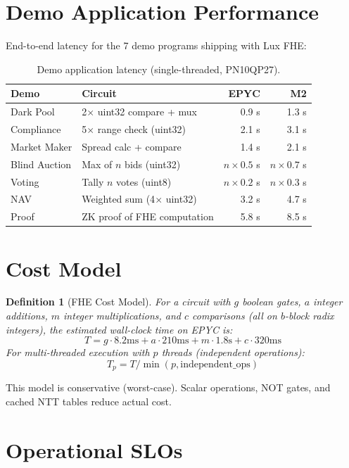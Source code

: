 \documentclass[11pt]{article}
\newtheorem{definition}{Definition}
\begin{document}
\section{Demo Application Performance}

End-to-end latency for the 7 demo programs shipping with Lux FHE:

\begin{table}[h]
\centering
\small
\begin{tabular}{@{}llrr@{}}
\toprule
\textbf{Demo} & \textbf{Circuit} & \textbf{EPYC} & \textbf{M2} \\
\midrule
Dark Pool & 2$\times$ uint32 compare + mux & 0.9 s & 1.3 s \\
Compliance & 5$\times$ range check (uint32) & 2.1 s & 3.1 s \\
Market Maker & Spread calc + compare & 1.4 s & 2.1 s \\
Blind Auction & Max of $n$ bids (uint32) & $n \times 0.5$ s & $n \times 0.7$ s \\
Voting & Tally $n$ votes (uint8) & $n \times 0.2$ s & $n \times 0.3$ s \\
NAV & Weighted sum (4$\times$ uint32) & 3.2 s & 4.7 s \\
Proof & ZK proof of FHE computation & 5.8 s & 8.5 s \\
\bottomrule
\end{tabular}
\caption{Demo application latency (single-threaded, PN10QP27).}
\label{tab:demos}
\end{table}

\section{Cost Model}

\begin{definition}[FHE Cost Model]
For a circuit with $g$ boolean gates, $a$ integer additions, $m$ integer multiplications, and $c$ comparisons (all on $b$-block radix integers), the estimated wall-clock time on EPYC is:
$$T = g \cdot 8.2\text{ms} + a \cdot 210\text{ms} + m \cdot 1.8\text{s} + c \cdot 320\text{ms}$$
For multi-threaded execution with $p$ threads (independent operations):
$$T_p = T / \min(p, \text{independent\_ops})$$
\end{definition}

This model is conservative (worst-case). Scalar operations, NOT gates, and cached NTT tables reduce actual cost.

\section{Operational SLOs}
\end{document}
